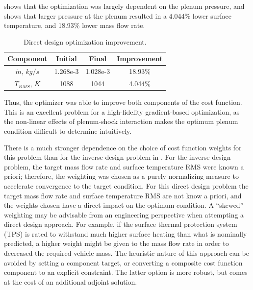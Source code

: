  shows that the optimization was largely dependent on the
plenum pressure, and  shows that larger pressure at
the plenum resulted in a 4.044\% lower surface temperature, and 18.93\% lower
mass flow rate.
\vspace{0.3cm}
\begin{table}[h]
  \centering
  \caption{Direct design optimization improvement.}
  \begin{tabular}{c|c|c|c}
    Component & Initial & Final & Improvement\\
    \hline
    $\dot{m}$, $kg/s$ & 1.268e-3 & 1.028e-3 & 18.93\% \\
    $T_{RMS}$, $K$    & 1088     & 1044     & 4.044\%
  \end{tabular}
  \label{tab:design-improvement}
\end{table}
Thus, the optimizer was able to improve both components of the cost function.
This is an excellent problem for a high-fidelity gradient-based
optimization, as the non-linear effects of plenum-shock interaction makes the
optimum plenum condition difficult to determine intuitively.

There is a much stronger dependence on the choice of cost function weights for
this problem than for the inverse design problem in .  For
the inverse design problem, the target mass flow rate and surface temperature
RMS were known a priori; therefore, the weighting was chosen as a purely
normalizing measure to accelerate convergence to the target condition.  For this
direct design problem the target mass flow rate and surface temperature RMS are
not know a priori, and the weights chosen have a direct impact on the optimum
condition.  A ``skewed'' weighting may be advisable from an engineering
perspective when attempting a direct design approach.  For example, if the
surface thermal protection system (TPS) is rated to withstand much higher
surface heating than what is nominally predicted, a higher weight might be given
to the mass flow rate in order to decreased the required vehicle mass.  The
heuristic nature of this approach can be avoided by setting a component target,
or converting a composite cost function component to an explicit constraint.
The latter option is more robust, but comes at the cost of an additional adjoint
solution.
